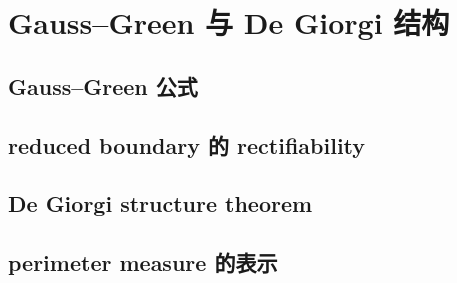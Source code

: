 \section{Gauss–Green 与 De Giorgi 结构}
\label{b1:sec:2705}


\subsection{Gauss–Green 公式}
\label{b1:subsec:270501}

\subsection{reduced boundary 的 rectifiability}
\label{b1:subsec:270502}

\subsection{De Giorgi structure theorem}
\label{b1:subsec:270503}

\subsection{perimeter measure 的表示}
\label{b1:subsec:270504}


